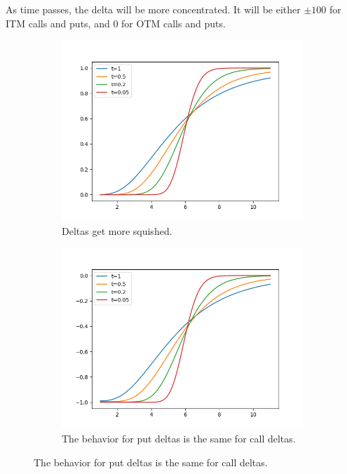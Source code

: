 \documentclass{article}
\begin{document}
    \begin{theorem}
      As time passes, the delta will be more concentrated. It will be either $\pm 100$ for ITM calls and puts, and $0$ for OTM calls and puts.
      \begin{figure}[H]
        \centering
        \begin{subfigure}[b]{0.48\textwidth}
        \centering
          \includegraphics[scale=0.4]{img/delta_call_wrt_time.png}
          \caption{Deltas get more squished. }
          \label{fig:delta_call_wrt_time}
        \end{subfigure}
        \hfill 
        \begin{subfigure}[b]{0.48\textwidth}
        \centering
          \includegraphics[scale=0.4]{img/delta_put_wrt_time.png}
          \caption{The behavior for put deltas is the same for call deltas.}
          \label{fig:delta_put_wrt_time}
        \end{subfigure}
          \label{fig:delta_wrt_time}
      \end{figure}
    \end{theorem}
\end{document}
